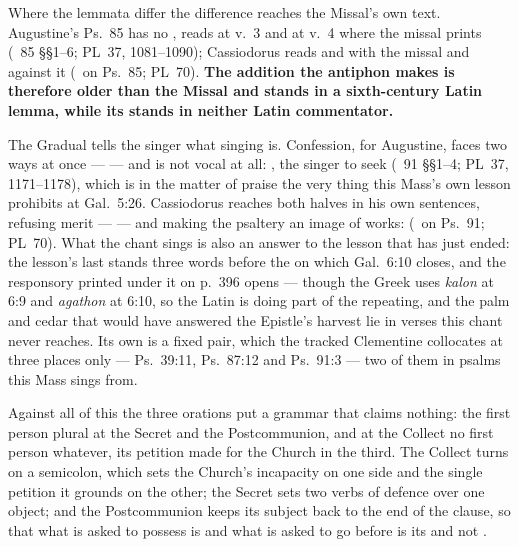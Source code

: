 Where the lemmata differ the difference reaches the Missal's own text.
Augustine's Ps.~85 has no , reads  at v.~3
and  at v.~4 where the missal prints 
(~85 §§1--6; PL~37, 1081--1090); Cassiodorus reads  and  with the missal and  against it
(\ on Ps.~85; PL~70). \textbf{The addition the antiphon makes
is therefore older than the Missal and stands in a sixth-century Latin lemma,
while its  stands in neither Latin commentator.}

The Gradual tells the singer what singing is. Confession, for Augustine, faces
two ways at once ---  --- and 
is not vocal at all: , the singer to seek  (~91 §§1--4; PL~37, 1171--1178), which is in
the matter of praise the very thing this Mass's own lesson prohibits at Gal.\ 5:26.
Cassiodorus reaches both halves in his own sentences, refusing merit ---
 --- and making the psaltery an image of works: 
(\ on Ps.~91; PL~70). What the chant sings is also an answer
to the lesson that has just ended: the lesson's last  stands
three words before the  on which
Gal.\ 6:10 closes, and the responsory printed under it on p.~396 opens
 --- though the Greek uses \emph{kalon} at 6:9 and
\emph{agathon} at 6:10, so the Latin is doing part of the repeating, and the
palm and cedar that would have answered the Epistle's harvest lie in verses
this chant never reaches. Its own 
is a fixed pair, which the tracked Clementine collocates at three places only
--- Ps.\ 39:11, Ps.\ 87:12 and Ps.\ 91:3 --- two of them in psalms this Mass
sings from.

Against all of this the three orations put a grammar that claims nothing: the
first person plural at the Secret and the Postcommunion, and at the Collect no
first person whatever, its petition made for the Church in the third. The
Collect turns on a semicolon, which sets the Church's incapacity on one side
and the single petition it grounds on the other; the Secret sets two verbs of
defence over one object; and the Postcommunion keeps its subject back to the
end of the clause, so that what is asked to possess is  and what is asked to go before is its  and not
.

